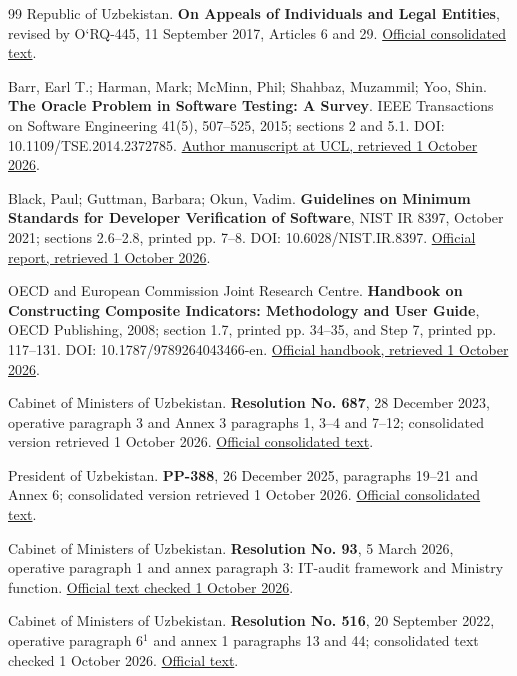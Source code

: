 \begin{thebibliography}{99}
 Republic of Uzbekistan. \textbf{On Appeals of Individuals and Legal Entities}, revised by O‘RQ-445, 11 September 2017, Articles 6 and 29. \href{https://lex.uz/docs/-3336169}{Official consolidated text}.

 Barr, Earl T.; Harman, Mark; McMinn, Phil; Shahbaz, Muzammil; Yoo, Shin. \textbf{The Oracle Problem in Software Testing: A Survey}. IEEE Transactions on Software Engineering 41(5), 507–525, 2015; sections 2 and 5.1. DOI: 10.1109/TSE.2014.2372785. \href{https://discovery.ucl.ac.uk/id/eprint/1471263/1/06963470.pdf}{Author manuscript at UCL, retrieved 1 October 2026}.

 Black, Paul; Guttman, Barbara; Okun, Vadim. \textbf{Guidelines on Minimum Standards for Developer Verification of Software}, NIST IR 8397, October 2021; sections 2.6–2.8, printed pp. 7–8. DOI: 10.6028/NIST.IR.8397. \href{https://nvlpubs.nist.gov/nistpubs/ir/2021/NIST.IR.8397.pdf}{Official report, retrieved 1 October 2026}.

 OECD and European Commission Joint Research Centre. \textbf{Handbook on Constructing Composite Indicators: Methodology and User Guide}, OECD Publishing, 2008; section 1.7, printed pp. 34–35, and Step 7, printed pp. 117–131. DOI: 10.1787/9789264043466-en. \href{https://www.oecd.org/content/dam/oecd/en/publications/reports/2008/08/handbook-on-constructing-composite-indicators-methodology-and-user-guide_g1gh9301/9789264043466-en.pdf}{Official handbook, retrieved 1 October 2026}.


 Cabinet of Ministers of Uzbekistan. \textbf{Resolution No. 687}, 28 December 2023, operative paragraph 3 and Annex 3 paragraphs 1, 3–4 and 7–12; consolidated version retrieved 1 October 2026. \href{https://lex.uz/docs/-6720230}{Official consolidated text}.

 President of Uzbekistan. \textbf{PP-388}, 26 December 2025, paragraphs 19–21 and Annex 6; consolidated version retrieved 1 October 2026. \href{https://lex.uz/docs/-7959569}{Official consolidated text}.

 Cabinet of Ministers of Uzbekistan. \textbf{Resolution No. 93}, 5 March 2026, operative paragraph 1 and annex paragraph 3: IT-audit framework and Ministry function. \href{https://lex.uz/docs/-8076376}{Official text checked 1 October 2026}.

 Cabinet of Ministers of Uzbekistan. \textbf{Resolution No. 516}, 20 September 2022, operative paragraph 6$^{1}$ and annex 1 paragraphs 13 and 44; consolidated text checked 1 October 2026. \href{https://lex.uz/docs/-6200851}{Official text}.


\end{thebibliography}

